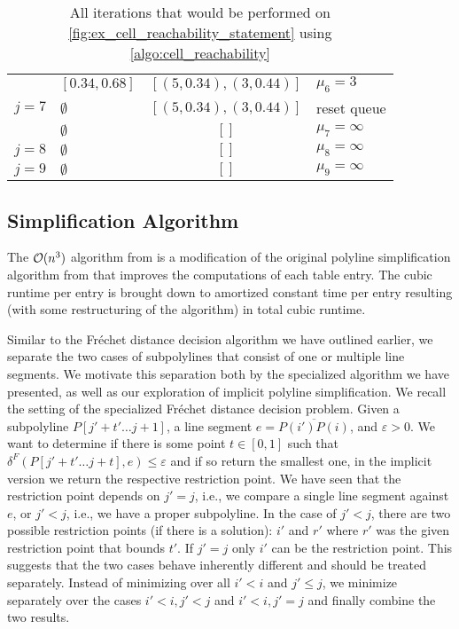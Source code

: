 \begin{table}[htb]
\begin{tabular}{|llcl|}
						& \([0.34, 0.68]\) & \([(5, 0.34), (3, 0.44)]\) & \(\mu_6 = 3\)\\
		\(j=7\) & \(\emptyset\)    & \([(5, 0.34), (3, 0.44)]\) & reset queue\\
		        & \(\emptyset\)    & \([]\) & \(\mu_7 = \infty\)\\
		\(j=8\) & \(\emptyset\)    & \([]\) & \(\mu_8 = \infty\)\\
		\(j=9\) & \(\emptyset\)    & \([]\) & \(\mu_9 = \infty\)\\
		\hline 
  \end{tabular}
	\caption{All iterations that would be performed on \cref{fig:ex_cell_reachability_statement} using \cref{algo:cell_reachability}}
	\label{tab:cell_reachability_execution}
\end{table}

\subsection{Simplification Algorithm}
\label{ssec:simplification_algo_cubic}

The \(\mathcal{O}(n^3)\) algorithm from \citeauthor{polyline_simplification_has_cubic_complexity_bringmannetal} is a modification of the original polyline simplification algorithm from \citeauthor{on_optimal_polyline_simplification_using_the_hausdorff_and_frechet_distance} that improves the computations of each table entry. The cubic runtime per entry is brought down to amortized constant time per entry resulting (with some restructuring of the algorithm) in total cubic runtime. 

Similar to the Fréchet distance decision algorithm we have outlined earlier, we separate the two cases of subpolylines that consist of one or multiple line segments. We motivate this separation both by the specialized algorithm we have presented, as well as our exploration of implicit polyline simplification. We recall the setting of the specialized Fréchet distance decision problem. Given a subpolyline \(P[j' + t' \dots j + 1]\), a line segment \(e = \overline{P(i')P(i)}\), and \(\varepsilon > 0\). We want to determine if there is some point \(t \in [0, 1]\) such that \(\delta^F(P[j' + t' \dots j + t], e) \leq \varepsilon\) and if so return the smallest one, in the implicit version we return the respective restriction point. We have seen that the restriction point depends on \(j' = j\), i.e., we compare a single line segment against \(e\), or \(j' < j\), i.e., we have a proper subpolyline. 
In the case of \(j' < j\), there are two possible restriction points (if there is a solution): \(i'\) and \(r'\) where \(r'\) was the given restriction point that bounds \(t'\). If \(j' = j\) only \(i'\) can be the restriction point. This suggests that the two cases behave inherently different and should be treated separately. Instead of minimizing over all \(i' < i\) and \(j' \leq j\), we minimize separately over the cases \(i' < i, j' < j\) and \(i' < i, j' = j\) and finally combine the two results.

